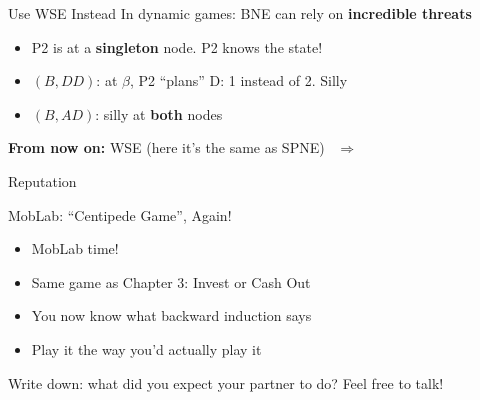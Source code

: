 \begin{frame}{Use WSE Instead}
In dynamic games: BNE can rely on \textbf{incredible threats}
\begin{itemize}
    \item P2 is at a \textbf{singleton} node. P2 knows the state!
    \item $(B,DD)$: at $\beta$, P2 ``plans'' D: 1 instead of 2. Silly
    \item $(B,AD)$: silly at \textbf{both} nodes
\end{itemize}
\bsk
\textbf{From now on:} WSE (here it's the same as SPNE) \ $\Rightarrow$ \ \underline{\hspace{0.8in}}
\bsk
{}
\bsk
{}
\vspace{-0.3in}
\end{frame}


\begin{frame}[standout]
Reputation
\end{frame}

\begin{frame}{MobLab: ``Centipede Game'', Again!}
\begin{itemize}
    \item MobLab time!
    \item Same game as Chapter 3: Invest or Cash Out
    \item You now know what backward induction says
    \item Play it the way you'd actually play it
\end{itemize}
\bsk
Write down: what did you expect your partner to do?
\vfill
\centering
Feel free to talk!
\vspace{-0.2in}
\end{frame}

